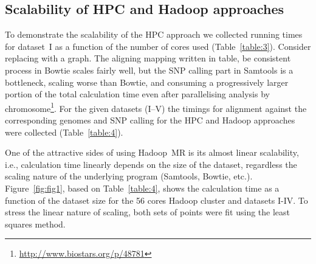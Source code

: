 \documentclass[11pt, oneside]{article}   	%
\newcommand{\COMMENT}[1]{{\color{red} #1 }}
\begin{document}
\subsection{Scalability of HPC and Hadoop approaches}
To demonstrate the scalability of the HPC approach we collected running times for dataset~I as a function of the number of cores used (Table~\ref{table:3}). \COMMENT{Consider replacing with a graph.}
The aligning \COMMENT{mapping written in table, be consistent} process in Bowtie scales fairly well, but the SNP calling part in Samtools is a bottleneck, scaling worse than Bowtie, and consuming a progressively larger portion of the total calculation time even after parallelising analysis by chromosome\footnote{\url{http://www.biostars.org/p/48781}}.
For the given datasets (I--V) the timings for alignment against the corresponding genomes and SNP calling for the HPC and Hadoop approaches were collected (Table~\ref{table:4}).

One of the attractive sides of using Hadoop~MR is its almost linear scalability, i.e., calculation time linearly depends on the size of the dataset\cite{crossbow,seal}, regardless the scaling nature of the underlying program (Samtools, Bowtie, etc.).
Figure~\ref{fig:fig1}, based on Table~\ref{table:4}, shows the calculation time as a function of the dataset size for the 56 cores Hadoop cluster and datasets I-IV.
To stress the linear nature of scaling, both sets of points were fit using the least squares method.
\end{document}
